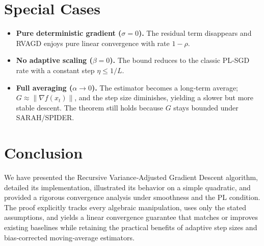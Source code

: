 \documentclass[11pt]{article}
\newcommand{\grad}{\nabla}
\begin{document}
\section*{Special Cases}
\begin{itemize}
\item \textbf{Pure deterministic gradient ($\sigma=0$).}  The residual term disappears and RVAGD enjoys pure linear convergence with rate $1-\rho$.
\item \textbf{No adaptive scaling ($\beta=0$).}  The bound reduces to the classic PL‑SGD rate with a constant step $\eta\le 1/L$.
\item \textbf{Full averaging ($\alpha\to0$).}  The estimator becomes a long‑term average; $G\approx\|\grad f(x_t)\|$, and the step size diminishes, yielding a slower but more stable descent.  The theorem still holds because $G$ stays bounded under SARAH/SPIDER.
\end{itemize}

\section*{Conclusion}
We have presented the Recursive Variance‑Adjusted Gradient Descent algorithm, detailed its implementation, illustrated its behavior on a simple quadratic, and provided a rigorous convergence analysis under smoothness and the PL condition.  The proof explicitly tracks every algebraic manipulation, uses only the stated assumptions, and yields a linear convergence guarantee that matches or improves existing baselines while retaining the practical benefits of adaptive step sizes and bias‑corrected moving‑average estimators.  
\end{document}
